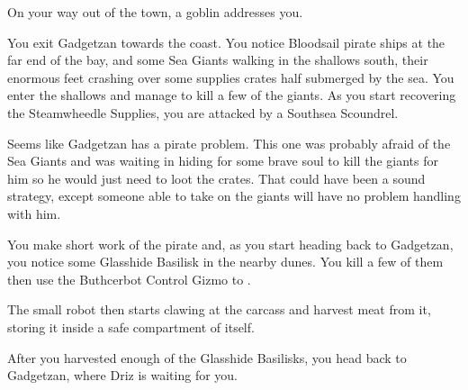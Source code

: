 


On your way out of the town, a goblin addresses you.


You exit Gadgetzan towards the coast. You notice Bloodsail pirate ships at the far end of the bay, and some Sea Giants walking in the shallows south, their enormous feet crashing over some supplies crates half submerged by the sea. You enter the shallows and manage to kill a few of the giants. As you start recovering the Steamwheedle Supplies, you are attacked by a Southsea Scoundrel.


Seems like Gadgetzan has a pirate problem. This one was probably afraid of the Sea Giants and was waiting in hiding for some brave soul to kill the giants for him so he would just need to loot the crates. That could have been a sound strategy, except someone able to take on the giants will have no problem handling with him.

You make short work of the pirate and, as you start heading back to Gadgetzan, you notice some Glasshide Basilisk in the nearby dunes. You kill a few of them then use the Buthcerbot Control Gizmo to .  %


The small robot then starts clawing at the carcass and harvest meat from it, storing it inside a safe compartment of itself.

After you harvested enough of the Glasshide Basilisks, you head back to Gadgetzan, where Driz is waiting for you.

